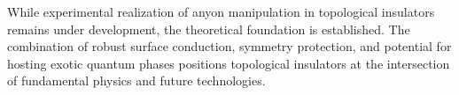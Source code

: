 While experimental realization of anyon manipulation in topological insulators remains under development, the theoretical foundation is established. The combination of robust surface conduction, symmetry protection, and potential for hosting exotic quantum phases positions topological insulators at the intersection of fundamental physics and future technologies.
